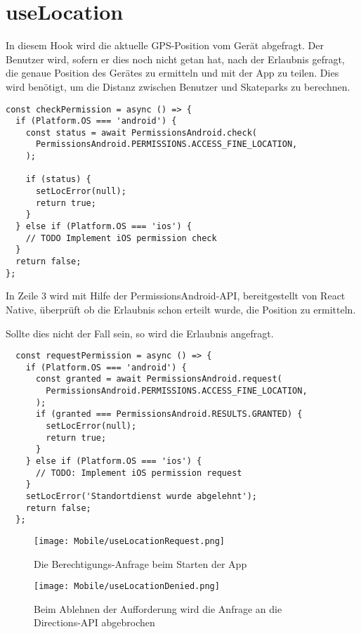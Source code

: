 \section{useLocation}
In diesem Hook wird die aktuelle GPS-Position vom Gerät abgefragt. Der Benutzer wird, sofern er dies
noch nicht getan hat, nach der Erlaubnis gefragt, die genaue Position des Gerätes zu ermitteln und
mit der App zu teilen. Dies wird benötigt, um die Distanz zwischen Benutzer und Skateparks zu
berechnen.

\begin{lstlisting}
const checkPermission = async () => {
  if (Platform.OS === 'android') {
    const status = await PermissionsAndroid.check(
      PermissionsAndroid.PERMISSIONS.ACCESS_FINE_LOCATION,
    );

    if (status) {
      setLocError(null);
      return true;
    }
  } else if (Platform.OS === 'ios') {
    // TODO Implement iOS permission check
  }
  return false;
};
\end{lstlisting}

In Zeile 3 wird mit Hilfe der PermissionsAndroid-API, bereitgestellt von React Native, überprüft
ob die Erlaubnis schon erteilt wurde, die Position zu ermitteln.

Sollte dies nicht der Fall sein, so wird die Erlaubnis angefragt.


\begin{lstlisting}
  const requestPermission = async () => {
    if (Platform.OS === 'android') {
      const granted = await PermissionsAndroid.request(
        PermissionsAndroid.PERMISSIONS.ACCESS_FINE_LOCATION,
      );
      if (granted === PermissionsAndroid.RESULTS.GRANTED) {
        setLocError(null);
        return true;
      }
    } else if (Platform.OS === 'ios') {
      // TODO: Implement iOS permission request
    }
    setLocError('Standortdienst wurde abgelehnt');
    return false;
  };
  \end{lstlisting}

\begin{figure}[H]
  \begin{center}
    \texttt{[image: Mobile/useLocationRequest.png]}
    \caption{Die Berechtigungs-Anfrage beim Starten der App}
  \end{center}
\end{figure}

\begin{figure}[H]
  \begin{center}
    \texttt{[image: Mobile/useLocationDenied.png]}
    \caption{Beim Ablehnen der Aufforderung wird die Anfrage an die Directions-API abgebrochen}
  \end{center}
\end{figure}

